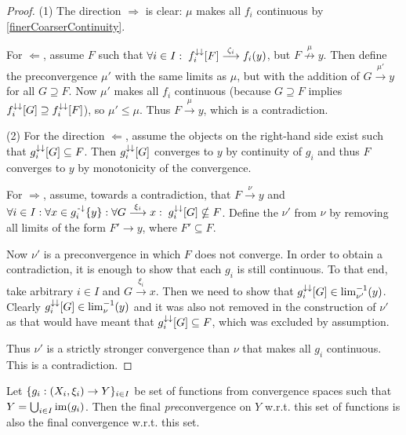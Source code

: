 \begin{proof}
(1) The direction $\Rightarrow$ is clear: $\mu$ makes all $f_i$ continuous by \ref{finerCoarserContinuity}.

For $\Leftarrow$, assume $F$ such that $\forall i\in I: \; f_i^{\downarrow\downarrow}[F] \overset{\zeta_i}{\longrightarrow} f_i(y)$, but $F \overset{\mu}{\not\to} y$. Then define the preconvergence $\mu'$ with the same limits as $\mu$, but with the addition of $G\overset{\mu'}{\longrightarrow} y$ for all $G\supseteq F$. Now $\mu'$ makes all $f_i$ continuous (because $G\supseteq F$ implies $f_i^{\downarrow\downarrow}[G] \supseteq f_i^{\downarrow\downarrow}[F]$), so $\mu'\leq \mu$. Thus $F \overset{\mu}{\longrightarrow} y$, which is a contradiction.

(2) For the direction $\Leftarrow$, assume the objects on the right-hand side exist such that $g_i^{\downarrow\downarrow}[G] \subseteq F$. Then $g_i^{\downarrow\downarrow}[G]$ converges to $y$ by continuity of $g_i$ and thus $F$ converges to $y$ by monotonicity of the convergence.

For $\Rightarrow$, assume, towards a contradiction, that $F \overset{\nu}{\longrightarrow} y$ and $\forall i\in I: \forall x\in g_i^{{\text{\hspace{0.15em}-}\downarrow}}\{y\}: \forall G\overset{\xi_i}{\longrightarrow} x: \; g_i^{\downarrow\downarrow}[G] \nsubseteq F$. Define the $\nu'$ from $\nu$ by removing all limits of the form $F' \to y$, where $F' \subseteq F$.

Now $\nu'$ is a preconvergence in which $F$ does not converge. In order to obtain a contradiction, it is enough to show that each $g_i$ is still continuous. To that end, take arbitrary $i\in I$ and $G \overset{\xi_i}{\longrightarrow} x$. Then we need to show that $g_i^{\downarrow\downarrow}[G] \in \lim^{-1}_{\nu'}(y)$. Clearly $g_i^{\downarrow\downarrow}[G] \in \lim^{-1}_{\nu}(y)$ and it was also not removed in the construction of $\nu'$ as that would have meant that $g_i^{\downarrow\downarrow}[G] \subseteq F$, which was excluded by assumption.

Thus $\nu'$ is a strictly stronger convergence than $\nu$ that makes all $g_i$ continuous. This is a contradiction.
\end{proof}
\begin{corollary} \label{finalConvergenceConvergence}
Let $\{g_i: \left( X_i, \xi_i \right) \to Y\}_{i\in I}$ be set of functions from convergence spaces such that $Y = \bigcup_{i\in I}\operatorname{im}(g_i)$. Then the final \emph{pre}convergence on $Y$ w.r.t. this set of functions is also the final convergence w.r.t. this set.
\end{corollary}
